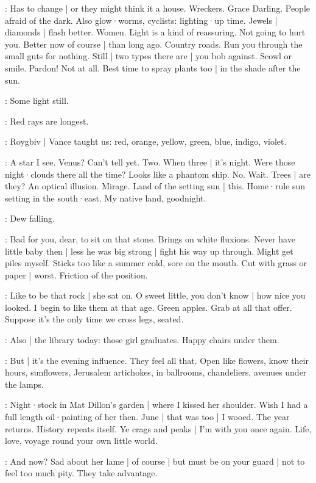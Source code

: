\BloomAbstract:
Has to change |
or they might think it a house.
Wreckers.
Grace Darling.
People afraid of the dark.
Also glow·worms,
cyclists:
lighting·up time.%
Jewels |
diamonds |
flash better.
Women.
Light is a kind of reassuring.
Not going to hurt you.
Better now of course |
than long ago.
Country roads.
Run you through the small guts for nothing.
Still |
two types there are |
you bob against.
Scowl or smile.
Pardon!
Not at all.
Best time to spray plants too |
in the shade after the sun.

\BloomCurrent:
Some light still.

\BloomAbstract:
Red rays are longest.

\BloomHist:
Roygbiv |
Vance taught us:
red,
orange,
yellow,
green,
blue,
indigo,
violet.

\BloomCurrent:
A star
I see.
Venus?
Can't tell yet.
Two.
When three |
it's night.
Were those night·clouds there all the time?
Looks like a phantom ship.
No.
Wait.
Trees |
are they?
An optical illusion.
Mirage.
Land of the setting sun |
this.
Home·rule sun setting in the south·east.
My native land,%
goodnight.

\BloomCurrent:
Dew falling.

\BloomAbstract:
Bad for you,
dear,
to sit on that stone.
Brings on white fluxions.
Never have little baby then |
less he was big strong |
fight his way up through.
Might get piles myself.
Sticks too like a summer cold,
sore on the mouth.
Cut with grass or paper |
worst.
Friction of the position.

\BloomCurrent:
Like to be that rock |
she sat on.
O sweet little,
you don't know |
how nice you looked.
I begin to like them at that age.
Green apples.
Grab at all that offer.
Suppose it's the only time we cross legs,
seated.

\BloomToday:
Also |
the library today:
those girl graduates.
Happy chairs under them.

\BloomAbstract:
But |
it's the evening influence.
They feel all that.
Open like flowers,
know their hours,
sunflowers,
Jerusalem artichokes,
in ballrooms,
chandeliers,
avenues under the lamps.%

\BloomHist:
Night·stock in Mat Dillon's garden |
where I kissed her shoulder.
Wish I had a full length oil·painting of her then.
June |
that was too |
I wooed.
The year returns.
History repeats itself.
Ye crags and peaks |
I'm with you once again.
Life,
love,
voyage round your own little world.

\BloomCurrent:
And now?
Sad about her lame |
of course |
but must be on your guard |
not to feel too much pity.
They take advantage.

